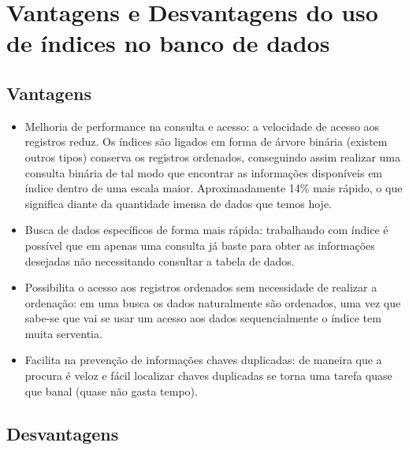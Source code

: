 \documentclass[12pt,a4paper]{article}
\begin{document}
\section{Vantagens e Desvantagens do uso de índices no banco de dados}

\subsection{Vantagens}

\begin{itemize}
	\item Melhoria de performance na consulta e acesso: a velocidade de acesso aos registros reduz. Os índices são ligados em forma de árvore binária (existem outros tipos) conserva os registros ordenados, conseguindo assim realizar uma consulta binária de tal modo que encontrar as informações disponíveis em índice dentro de uma escala maior. Aproximadamente 14\% mais rápido, o que significa diante da quantidade imensa de dados que temos hoje.
	
	\item Busca de dados específicos de forma mais rápida: trabalhando com índice é possível que em apenas uma consulta já baste para obter as informações desejadas não necessitando consultar a tabela de dados.
	
	\item Possibilita o acesso aos registros ordenados sem necessidade de realizar a ordenação: em uma busca os dados naturalmente são ordenados, uma vez que sabe-se que vai se usar um acesso aos dados sequencialmente o índice tem muita serventia.
	
	\item Facilita na prevenção de informações chaves duplicadas: de maneira que a procura é veloz e fácil localizar chaves duplicadas se torna uma tarefa quase que banal (quase não gasta tempo).	
	
\end{itemize}

\subsection{Desvantagens}
\end{document}
